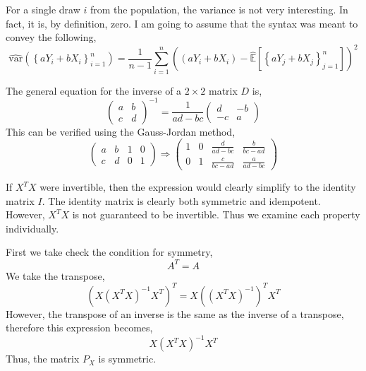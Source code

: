 \documentclass[12pt,twoside]{article}
\begin{document}
\begin{problems}
\begin{problemparts}
\problempart %

For a single draw $i$ from the population, the variance is not very interesting.
In fact, it is, by definition, zero. I am going to assume that the syntax was 
meant to convey the following,
$$ \hat{\mathrm{var}}\left(\left\{aY_i + bX_i\right\}_{i = 1}^n\right) = \frac{1}
{n - 1} \sum_{i = 1}^n \left( (aY_i + bX_i) - \hat{\mathbb{E}}\left[\left\{aY_j + 
bX_j\right\}_{j = 1}^n\right]\right)^2 $$

\problempart %

\problempart %

\problempart %

\end{problemparts}

\newpage

\problem  %

The general equation for the inverse of a $2 \times 2$ matrix $D$ is,
$$ \begin{pmatrix}
    a & b \\
    c & d
\end{pmatrix}^{-1} = \frac{1}{ad - bc} \begin{pmatrix}
    d & -b \\
    -c & a
\end{pmatrix} $$
This can be verified using the Gauss-Jordan method,
$$ \begin{pmatrix}
    a & b & 1 & 0 \\
    c & d & 0 & 1
\end{pmatrix} \Longrightarrow \begin{pmatrix}
    1 & 0 & \frac{d}{ad-bc} & \frac{b}{bc-ad} \\
    0 & 1 & \frac{c}{bc-ad} & \frac{a}{ad-bc}
\end{pmatrix} $$

\problem  %

If $X^TX$ were invertible, then the expression would clearly simplify to the
identity matrix $I$. The identity matrix is clearly both symmetric and 
idempotent. However, $X^T X$ is not guaranteed to be invertible. Thus we examine
each property individually.

First we take check the condition for symmetry,
$$ A^T = A $$
We take the transpose,
$$ \left(X \left(X^T X\right)^{-1} X^T\right)^T = X \left(\left(X^T
X\right)^{-1}\right)^T X^T $$
However, the transpose of an inverse is the same as the inverse of a transpose,
therefore this expression becomes,
$$ X \left(X^T X\right)^{-1} X^T $$
Thus, the matrix $P_X$ is symmetric.


\end{problems}
\end{document}
